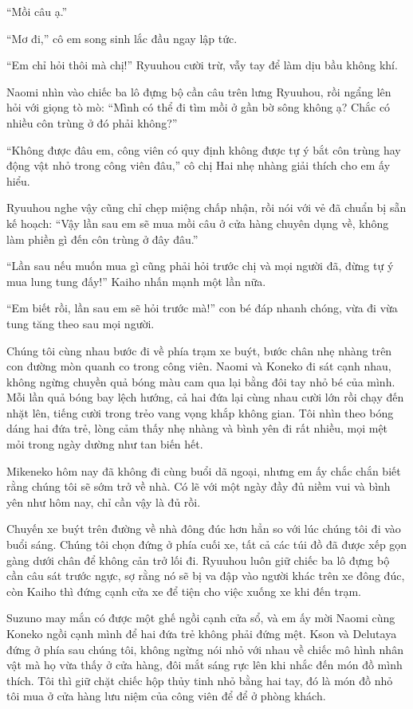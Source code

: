 ﻿\documentclass[../main.tex]{subfiles}
\begin{document}
``Mồi câu ạ.''

``Mơ đi,'' cô em song sinh lắc đầu ngay lập tức.

``Em chỉ hỏi thôi mà chị!'' Ryuuhou cười trừ, vẫy tay để làm dịu bầu không khí.

Naomi nhìn vào chiếc ba lô đựng bộ cần câu trên lưng Ryuuhou, rồi ngẩng lên hỏi với giọng tò mò: ``Mình có thể đi tìm mồi ở gần bờ sông không ạ? Chắc có nhiều côn trùng ở đó phải không?''

``Không được đâu em, công viên có quy định không được tự ý bắt côn trùng hay động vật nhỏ trong công viên đâu,'' cô chị Hai nhẹ nhàng giải thích cho em ấy hiểu.

Ryuuhou nghe vậy cũng chỉ chẹp miệng chấp nhận, rồi nói với vẻ đã chuẩn bị sẵn kế hoạch: ``Vậy lần sau em sẽ mua mồi câu ở cửa hàng chuyên dụng về, không làm phiền gì đến côn trùng ở đây đâu.''

``Lần sau nếu muốn mua gì cũng phải hỏi trước chị và mọi người đã, đừng tự ý mua lung tung đấy!'' Kaiho nhấn mạnh một lần nữa.

``Em biết rồi, lần sau em sẽ hỏi trước mà!'' con bé đáp nhanh chóng, vừa đi vừa tung tăng theo sau mọi người.

Chúng tôi cùng nhau bước đi về phía trạm xe buýt, bước chân nhẹ nhàng trên con đường mòn quanh co trong công viên. Naomi và Koneko đi sát cạnh nhau, không ngừng chuyền quả bóng màu cam qua lại bằng đôi tay nhỏ bé của mình. Mỗi lần quả bóng bay lệch hướng, cả hai đứa lại cùng nhau cười lớn rồi chạy đến nhặt lên, tiếng cười trong trẻo vang vọng khắp không gian. Tôi nhìn theo bóng dáng hai đứa trẻ, lòng cảm thấy nhẹ nhàng và bình yên đi rất nhiều, mọi mệt mỏi trong ngày dường như tan biến hết.

Mikeneko hôm nay đã không đi cùng buổi dã ngoại, nhưng em ấy chắc chắn biết rằng chúng tôi sẽ sớm trở về nhà. Có lẽ với một ngày đầy đủ niềm vui và bình yên như hôm nay, chỉ cần vậy là đủ rồi.

\ct

Chuyến xe buýt trên đường về nhà đông đúc hơn hẳn so với lúc chúng tôi đi vào buổi sáng. Chúng tôi chọn đứng ở phía cuối xe, tất cả các túi đồ đã được xếp gọn gàng dưới chân để không cản trở lối đi. Ryuuhou luôn giữ chiếc ba lô đựng bộ cần câu sát trước ngực, sợ rằng nó sẽ bị va đập vào người khác trên xe đông đúc, còn Kaiho thì đứng cạnh cửa xe để tiện cho việc xuống xe khi đến trạm.

Suzuno may mắn có được một ghế ngồi cạnh cửa sổ, và em ấy mời Naomi cùng Koneko ngồi cạnh mình để hai đứa trẻ không phải đứng mệt. Kson và Delutaya đứng ở phía sau chúng tôi, không ngừng nói nhỏ với nhau về chiếc mô hình nhân vật mà họ vừa thấy ở cửa hàng, đôi mắt sáng rực lên khi nhắc đến món đồ mình thích. Tôi thì giữ chặt chiếc hộp thủy tinh nhỏ bằng hai tay, đó là món đồ nhỏ tôi mua ở cửa hàng lưu niệm của công viên để để ở phòng khách.
\end{document}
